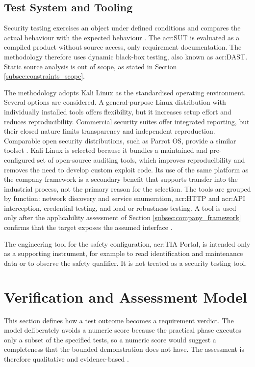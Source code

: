\subsection{Test System and Tooling} 
\label{subsec:execution_tooling} 

Security testing exercises an object under defined conditions and compares the actual behaviour with the expected behaviour \cite[p. ES-1]{nist_sp800_115}. The \gls{acr:SUT} is evaluated as a compiled product without source access, only requirement documentation. The methodology therefore uses dynamic black-box testing, also known as \gls{acr:DAST}. Static source analysis is out of scope, as stated in Section \ref{subsec:constraints_scope}. 

The methodology adopts Kali Linux as the standardised operating environment. Several options are considered. A general-purpose Linux distribution with individually installed tools offers flexibility, but it increases setup effort and reduces reproducibility. Commercial security suites offer integrated reporting, but their closed nature limits transparency and independent reproduction. Comparable open security distributions, such as Parrot OS, provide a similar toolset \cite{gfg_kali_alternatives_2024}. Kali Linux is selected because it bundles a maintained and pre-configured set of open-source auditing tools, which improves reproducibility and removes the need to develop custom exploit code. Its use of the same platform as the company framework is a secondary benefit that supports transfer into the industrial process, not the primary reason for the selection. The tools are grouped by function: network discovery and service enumeration, \gls{acr:HTTP} and \gls{acr:API} interception, credential testing, and load or robustness testing. A tool is used only after the applicability assessment of Section \ref{subsec:company_framework} confirms that the target exposes the assumed interface \cite{kali_whatis}. 

The engineering tool for the safety configuration, \gls{acr:TIA} Portal, is intended only as a supporting instrument, for example to read identification and maintenance data or to observe the safety qualifier. It is not treated as a security testing tool.




\section{Verification and Assessment Model} 
\label{sec:evaluation_metrics} 
This section defines how a test outcome becomes a requirement verdict. The model deliberately avoids a numeric score because the practical phase executes only a subset of the specified tests, so a numeric score would suggest a completeness that the bounded demonstration does not have. The assessment is therefore qualitative and evidence-based \cite[p. 144, 217]{Witte2019}. 


